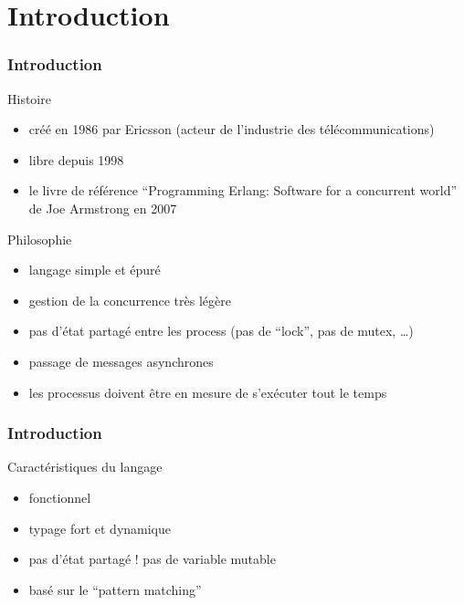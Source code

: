 \section{Introduction}

\begin{frame}
  \frametitle{Introduction}

  \begin{block}{Histoire}
    \begin{itemize}
      \item créé en 1986 par Ericsson (acteur de l'industrie des
        télécommunications)
      \item libre depuis 1998
      \item le livre de référence ``Programming Erlang: Software for a
        concurrent world'' de Joe Armstrong en 2007
    \end{itemize}
  \end{block}

  \begin{exampleblock}{Philosophie}
    \begin{itemize}
      \item langage simple et épuré
      \item gestion de la concurrence très légère
      \item pas d'état partagé entre les process (pas de ``lock'', pas de mutex,
        \ldots)
      \item passage de messages asynchrones
      \item les processus doivent être en mesure de s'exécuter tout le temps
    \end{itemize}
  \end{exampleblock}

\end{frame}

\begin{frame}
  \frametitle{Introduction}

  \begin{block}{Caractéristiques du langage}
    \begin{itemize}
      \item fonctionnel
      \item typage fort et dynamique
      \item pas d'état partagé ! pas de variable mutable
      \item basé sur le ``pattern matching''
    \end{itemize}
  \end{block}

\end{frame}

